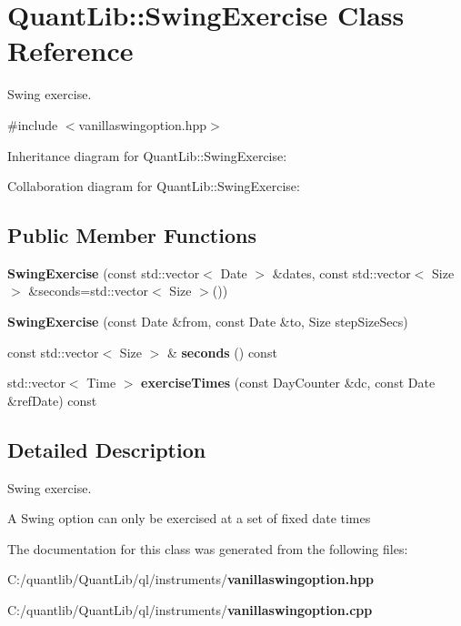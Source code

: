 \section{Quant\+Lib\+:\+:Swing\+Exercise Class Reference}
\label{class_quant_lib_1_1_swing_exercise}


Swing exercise.  




{\ttfamily \#include $<$vanillaswingoption.\+hpp$>$}



Inheritance diagram for Quant\+Lib\+:\+:Swing\+Exercise\+:


Collaboration diagram for Quant\+Lib\+:\+:Swing\+Exercise\+:
\subsection*{Public Member Functions}
\begin{DoxyCompactItemize}
\item 
{\bfseries Swing\+Exercise} (const std\+::vector$<$ Date $>$ \&dates, const std\+::vector$<$ Size $>$ \&seconds=std\+::vector$<$ Size $>$())\label{class_quant_lib_1_1_swing_exercise_ae8386d044590a6d69b33fab93c927f54}

\item 
{\bfseries Swing\+Exercise} (const Date \&from, const Date \&to, Size step\+Size\+Secs)\label{class_quant_lib_1_1_swing_exercise_a8215c2e2d0e2196000c45155f9e81ce5}

\item 
const std\+::vector$<$ Size $>$ \& {\bfseries seconds} () const \label{class_quant_lib_1_1_swing_exercise_a4b3918a99ac125399f02e2c2bef76bd5}

\item 
std\+::vector$<$ Time $>$ {\bfseries exercise\+Times} (const Day\+Counter \&dc, const Date \&ref\+Date) const \label{class_quant_lib_1_1_swing_exercise_a8431d54b5e37c29725559c7c1c34b674}

\end{DoxyCompactItemize}


\subsection{Detailed Description}
Swing exercise. 

A Swing option can only be exercised at a set of fixed date times 

The documentation for this class was generated from the following files\+:\begin{DoxyCompactItemize}
\item 
C\+:/quantlib/\+Quant\+Lib/ql/instruments/{\bf vanillaswingoption.\+hpp}\item 
C\+:/quantlib/\+Quant\+Lib/ql/instruments/{\bf vanillaswingoption.\+cpp}\end{DoxyCompactItemize}
